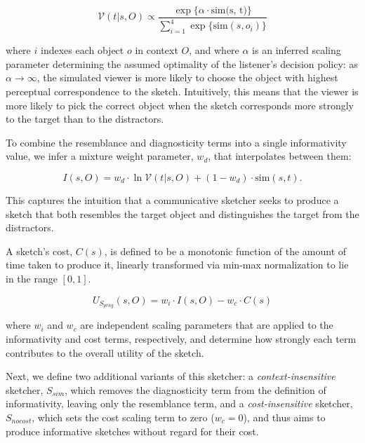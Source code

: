 \documentclass[9pt,twocolumn,twoside]{pnas-new}
\begin{document}
\begin{equation} \label{literal_viewer_score}
\mathcal{V}(t|s,O) \propto \frac {\exp\{\alpha \cdot \textrm{sim(s, t)}\}} {\sum_{i=1}^{4} \exp\{\textrm{sim}(s,o_i)\}}
\end{equation}

where $i$ indexes each object $o$ in context $O$, and where $\alpha$ is an inferred scaling parameter determining the assumed optimality of the listener's decision policy: as $\alpha \rightarrow \infty$, the simulated viewer is more likely to choose the object with highest perceptual correspondence to the sketch. 
Intuitively, this means that the viewer is more likely to pick the correct object when the sketch corresponds more strongly to the target than to the distractors. 

To combine the resemblance and diagnosticity terms into a single informativity value, we infer a mixture weight parameter, $w_{d}$, that interpolates between them:

\begin{equation} \label{prag_interpolation}
I(s,O) = w_{d} \cdot \ln \mathcal{V}(t|s,O) + (1-w_{d}) \cdot \textrm{sim}(s,t). 
\end{equation} 

This captures the intuition that a communicative sketcher seeks to produce a sketch that both resembles the target object and distinguishes the target from the distractors.

A sketch's cost, $C(s)$, is defined to be a monotonic function of the amount of time taken to produce it, linearly transformed via min-max normalization to lie in the range $[0,1]$.

\begin{equation} \label{sketcher_utility}
U_{S_{prag}}(s,O) = w_i \cdot I(s,O) - w_c \cdot  C(s)
\end{equation}

where $w_i$ and $w_c$ are independent scaling parameters that are applied to the informativity and cost terms, respectively, and determine how strongly each term contributes to the overall utility of the sketch. 

Next, we define two additional variants of this sketcher: a \textit{context-insensitive} sketcher, $S_{sim}$, which removes the diagnosticity term from the definition of informativity, leaving only the resemblance term, and a \textit{cost-insensitive} sketcher, $S_{nocost}$, which sets the cost scaling term to zero ($w_c=0$), and thus aims to produce informative sketches without regard for their cost.
\end{document}
